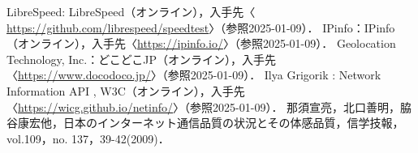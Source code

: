 \begin{thebibliography}{99}
     LibreSpeed: LibreSpeed（オンライン），入手先〈\url{ https://github.com/librespeed/speedtest}〉（参照2025-01-09）．
     IPinfo：IPinfo（オンライン），入手先〈\url{https://ipinfo.io/}〉（参照2025-01-09）．
      Geolocation Technology, Inc.：どこどこJP（オンライン），入手先〈\url{https://www.docodoco.jp/}〉（参照2025-01-09）．
     Ilya Grigorik : Network Information API , W3C（オンライン），入手先〈\url{https://wicg.github.io/netinfo/}〉（参照2025-01-09）．
     那須宣亮，北口善明，脇谷康宏他，日本のインターネット通信品質の状況とその体感品質，信学技報，vol.109，no. 137，39-42(2009)．
\end{thebibliography}

